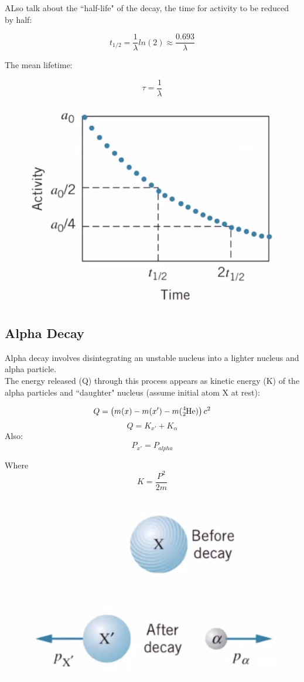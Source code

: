 \documentclass[class=article,crop=false]{standalone}
\begin{document}
ALso talk about the ``half-life" of the decay, the time for activity to be reduced by half:

$$ t_{1/2} = \frac{1}{\lambda} ln(2) \approx \frac{0.693}{\lambda} $$

The mean lifetime:

$$ \tau = \frac{1}{\lambda} $$

\begin{figure}[h!]
	\centering
	\includegraphics[width=.6\linewidth]{./Images/decay.png}
	\caption{}
\end{figure}

\subsection{Alpha Decay}
Alpha decay involves disintegrating an unstable nucleus into a lighter nucleus and alpha particle. \\

The energy released (Q) through this process appears as kinetic energy (K) of the alpha particles and ``daughter" nucleus (assume initial atom X at rest):

$$ Q = \left( m(x) - m(x') - m(\ce{^4_2He})\right)c^2 $$
$$ Q = K_{x'} + K_\alpha $$
Also:
$$ P_{x'} = P_{alpha} $$

Where
$$ K = \frac{P^2}{2m} $$

\begin{figure}[h!]
	\centering
	\includegraphics[width=.6\linewidth]{./Images/alpha_decay.png}
	\caption{}
\end{figure}
\end{document}
